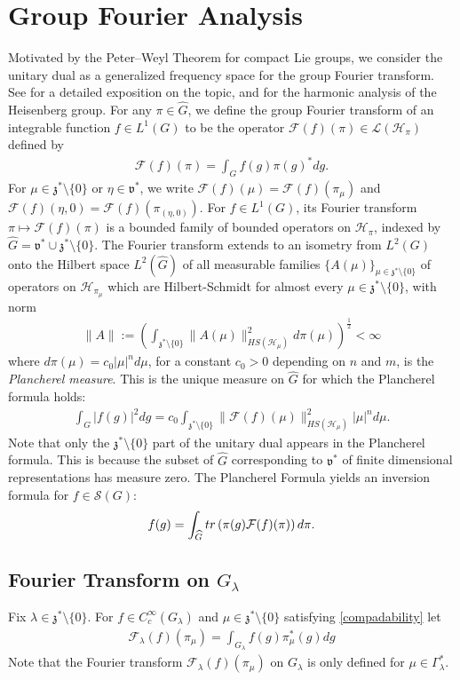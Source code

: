 \documentclass[11pt]{amsart}
\theoremstyle{plain}
\theoremstyle{definition}
\theoremstyle{remark}
\numberwithin{equation}{section}
\def\fz{\mathfrak{z}}
\def\fv{\mathfrak{v}}
\def\cH{\mathcal{H}}
\def\cF{\mathcal{F}}
\def\mz{\setminus\{0\}}
\numberwithin{equation}{section}
\begin{document}
\section{Group Fourier Analysis}\label{GFT}
Motivated by the Peter--Weyl Theorem for compact Lie groups, we consider the unitary dual as a generalized frequency space for the group Fourier transform. See \cite{fischerQuantizationNilpotentLie2016} for a detailed exposition on the topic, and \cite{follandHarmonicAnalysisPhase1989, gellerFourierAnalysisHeisenberg1977, thangaveluHarmonicAnalysisHeisenberg1998} for the harmonic analysis of the Heisenberg group. 
For any $\pi\in \widehat{G}$, we define the group Fourier transform of an integrable function $f\in L^1(G)$ to be the operator $\cF(f)(\pi)\in \mathcal{L}(\cH_\pi)$ defined by
\begin{align*}
	\mathcal{F}(f)(\pi)=\int_Gf(g)\pi(g)^*dg.
\end{align*}
For $\mu\in \fz^*\mz$ or $\eta\in \fv^*$, we write $\cF(f)(\mu)=\cF(f)(\pi_\mu)$ and $\cF(f)(\eta, 0)=\cF(f)(\pi_{(\eta, 0)})$. For $f\in L^1(G)$, its Fourier transform $\pi\mapsto \cF(f)(\pi)$ is a bounded family of bounded operators on $\cH_\pi$, indexed by $\widehat{G}=\fv^*\cup \fz^*\mz$. The Fourier transform extends to an isometry from $L^2(G)$ onto the Hilbert space $L^2(\widehat{G})$ of all measurable  families $\{A(\mu)\}_{\mu\in \fz^*\mz}$ of operators on $\cH_{\pi_\mu}$ which are Hilbert-Schmidt for almost every $\mu\in \fz^*\mz$, with norm
\begin{align*}
	\|A\|:=\left(\int_{\fz^*\mz}\|A(\mu)\|^2_{HS(\cH_\mu)}d\pi(\mu)\right)^{\frac{1}{2}}<\infty
\end{align*}
where $d\pi(\mu)=c_0|\mu|^nd\mu$, for a constant $c_0>0$ depending on $n$ and $m$, is the \textit{Plancherel measure}.
This is the unique measure on $\widehat{G}$ for which the Plancherel formula holds:
\begin{align*}
	\int_G |f(g)|^2dg=c_0\int_{\fz^*\mz}\|\cF(f)(\mu)\|^2_{HS(\cH_\mu)}|\mu|^nd\mu.
\end{align*}
Note that only the $\fz^*\mz$ part of the unitary dual appears in the Plancherel formula. This is because the subset of $\widehat{G}$  corresponding to $\fv^*$ of finite dimensional representations has measure zero. 
The Plancherel Formula yields an inversion formula for $f\in \mathcal{S}(G)$: 
\begin{align*}
	f(g)=\int_{\widehat{G}}{\rm tr}\left(\pi(g)\mathcal{F}(f)(\pi)\right)d\pi.
\end{align*}
\subsection{Fourier Transform on $G_\lambda$}
Fix $\lambda\in \fz^*\mz$. For $f\in C_c^\infty(G_\lambda)$ and $\mu\in \fz^*\setminus\{0\}$ satisfying \eqref{compadability} let 
\begin{align*}
	\mathcal{F}_\lambda(f)(\pi_\mu)=\int_{G_\lambda}f(g)\pi_\mu^*(g)dg
\end{align*}
Note that the Fourier transform $\cF_\lambda(f)(\pi_\mu)$ on $G_\lambda$ is only defined for $\mu\in \Gamma_\lambda^*$. 
\end{document}
